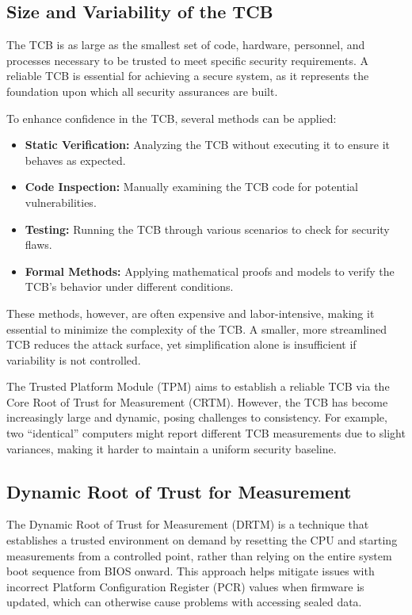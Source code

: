 \subsection{Size and Variability of the TCB}

The TCB is as large as the smallest set of code, hardware, personnel,
and processes necessary to be trusted to meet specific security
requirements. A reliable TCB is essential for achieving a secure
system, as it represents the foundation upon which all security
assurances are built.

To enhance confidence in the TCB, several methods can be applied:
\begin{itemize}
    \item \textbf{Static Verification:} Analyzing the TCB without
      executing it to ensure it behaves as expected.
    \item \textbf{Code Inspection:} Manually examining the TCB code
      for potential vulnerabilities.
    \item \textbf{Testing:} Running the TCB through various scenarios
      to check for security flaws.
    \item \textbf{Formal Methods:} Applying mathematical proofs and
      models to verify the TCB's behavior under different conditions.
\end{itemize}

These methods, however, are often expensive and labor-intensive,
making it essential to minimize the complexity of the TCB. A smaller,
more streamlined TCB reduces the attack surface, yet simplification
alone is insufficient if variability is not controlled.

The Trusted Platform Module (TPM) aims to establish a reliable TCB via
the Core Root of Trust for Measurement (CRTM). However, the TCB has
become increasingly large and dynamic, posing challenges to
consistency. For example, two “identical” computers might report
different TCB measurements due to slight variances, making it harder
to maintain a uniform security baseline.

\subsection{Dynamic Root of Trust for Measurement}

The Dynamic Root of Trust for Measurement (DRTM) is a technique that
establishes a trusted environment on demand by resetting the CPU and
starting measurements from a controlled point, rather than relying on
the entire system boot sequence from BIOS onward. This approach helps
mitigate issues with incorrect Platform Configuration Register (PCR)
values when firmware is updated, which can otherwise cause problems
with accessing sealed data.

